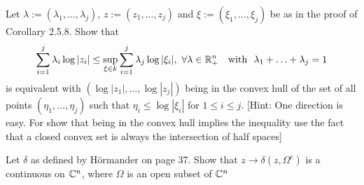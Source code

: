 \documentclass[../main.tex]{subfiles}
\begin{document}
\begin{problem}
Let $\lambda:=(\lambda_1, \ldots,\lambda_j)$, $z:=(z_1, \ldots,z_j)$ and $\xi:=(\xi_1, \ldots,\xi_j)$ be as in the proof of Corollary 2.5.8. Show that
$$ \sum_{i=1}^j \lambda_i \log|z_i| \leq \sup_{\xi \in k} \sum_{i=1}^j \lambda_j \log|\xi_i|, \ \forall \lambda\in \Bbb R^n_+ \ \ \text{ with } \ \lambda_1 + \ldots + \lambda_j =1$$
is equivalent with $(\log|z_1|,\ldots,\log|z_j|)$ being in the convex hull of the set of all points $(\eta_1,\ldots,\eta_j)$ such that  $\eta_i \leq \log |\xi_i|$ for $1 \leq i \leq j$. [Hint: One direction is easy. For show that being in the convex hull implies the inequality use the fact that a closed convex set is always the intersection of half spaces]
\end{problem}

\begin{problem}
Let $\delta$ as defined by H\"ormander on page 37. Show that $z \to \delta(z,\Omega^c)$ is a continuous on $\Bbb C^n$, where $\Omega$ is an open subset of $\Bbb C^n$
\end{problem}
\end{document}
